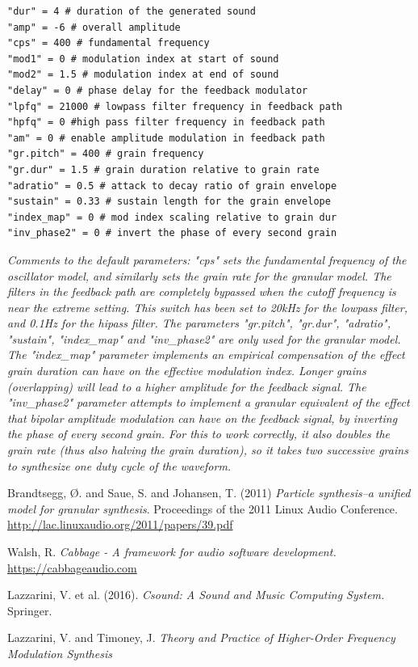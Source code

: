 \documentclass[runningheads,a4paper]{llncs}
\begin{document}
\noindent\begin{minipage}{\linewidth}
\begin{lstlisting}[caption=Default parameters for the synthesis models, label=lst:defaultparameters]
"dur" = 4 # duration of the generated sound
"amp" = -6 # overall amplitude
"cps" = 400 # fundamental frequency 
"mod1" = 0 # modulation index at start of sound
"mod2" = 1.5 # modulation index at end of sound
"delay" = 0 # phase delay for the feedback modulator
"lpfq" = 21000 # lowpass filter frequency in feedback path
"hpfq" = 0 #high pass filter frequency in feedback path
"am" = 0 # enable amplitude modulation in feedback path
"gr.pitch" = 400 # grain frequency 
"gr.dur" = 1.5 # grain duration relative to grain rate
"adratio" = 0.5 # attack to decay ratio of grain envelope
"sustain" = 0.33 # sustain length for the grain envelope
"index_map" = 0 # mod index scaling relative to grain dur
"inv_phase2" = 0 # invert the phase of every second grain
	\end{lstlisting}
		\emph{Comments to the default parameters: "cps" sets the fundamental frequency of the oscillator model, and similarly sets the grain rate for the granular model. The filters in the feedback path are completely bypassed when the cutoff frequency is near the extreme setting. This switch has been set to 20kHz for the lowpass filter, and 0.1Hz for the hipass filter. The parameters "gr.pitch", "gr.dur", "adratio", "sustain", "index\_map" and "inv\_phase2" are only used for the granular model. The "index\_map" parameter implements an empirical compensation of the effect grain duration can have on the effective modulation index. Longer grains (overlapping) will lead to a higher amplitude for the feedback signal. The "inv\_phase2" parameter attempts to implement a granular equivalent of the effect that bipolar amplitude modulation can have on the feedback signal, by inverting the phase of every second grain. For this to work correctly, it also doubles the grain rate (thus also halving the grain duration), so it takes two successive grains to synthesize one duty cycle of the waveform.}
	
\end{minipage}


\begin{thebibliography}{4}


 Brandtsegg, Ø. and Saue, S. and Johansen, T. (2011) \emph{Particle synthesis–a unified model for granular synthesis}. Proceedings of the 2011 Linux Audio Conference. \url{http://lac.linuxaudio.org/2011/papers/39.pdf}

 Walsh, R. \emph{Cabbage - A framework for audio software development.} \url{https://cabbageaudio.com}

 Lazzarini, V. et al. (2016). \emph{Csound: A Sound and Music Computing System.} Springer.

 Lazzarini, V. and Timoney, J. \emph{Theory and Practice of Higher-Order Frequency Modulation
Synthesis}


\end{thebibliography}
\end{document}
